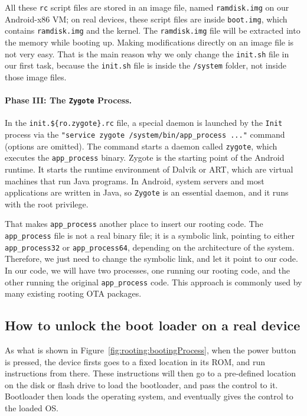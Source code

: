 All these \texttt{rc} script files are stored in an image file, named \texttt{ramdisk.img}
on our Android-x86 VM; on real devices, these script files are inside \texttt{boot.img}, 
which contains \texttt{ramdisk.img} and the kernel.
The \texttt{ramdisk.img} file will be extracted into the memory while booting
up. Making modifications directly on an image file is not very easy. That is the main reason
why we only change the \texttt{init.sh} file in our first task, because  
the \texttt{init.sh} file is inside the \texttt{/system} folder, not inside 
those image files. 


\paragraph{Phase III: The \texttt{Zygote} Process.}
In the \texttt{init.\$\{ro.zygote\}.rc} file, a special daemon is launched by the \texttt{Init}
process via the \texttt{"service zygote /system/bin/app\_process ..."} command (options are
omitted). The command starts a daemon called \texttt{zygote}, which executes 
the \texttt{app\_process} binary.
Zygote is the starting point of the Android runtime.
It starts the runtime environment of Dalvik or ART, which are virtual machines that run Java programs. 
In Android, system servers and most applications are written in Java, so \texttt{Zygote} is
an essential daemon, and it runs with the root privilege. 

That makes \texttt{app\_process} another place to insert our rooting code. 
The \texttt{app\_process} file is not a real binary file; it is a symbolic link, pointing to
either \texttt{app\_process32} or \texttt{app\_process64}, depending on the architecture of the system. 
Therefore, we just need to change the symbolic link, and let it point to our code. 
In our code, we will have two processes, one running our rooting code, and the other running 
the original \texttt{app\_process} code.  
This approach is commonly used by many existing rooting OTA packages. 



\subsection{How to unlock the boot loader on a real device}

As what is shown in Figure~\ref{fig:rooting:bootingProcess}, when the power
button is pressed, the device firsts goes to a fixed location in its ROM, and run
instructions from there. These instructions will then 
go to a pre-defined location on the disk or flash drive to 
load the bootloader, and pass the control to it. 
Bootloader then loads the operating system, and eventually gives the control
to the loaded OS.


